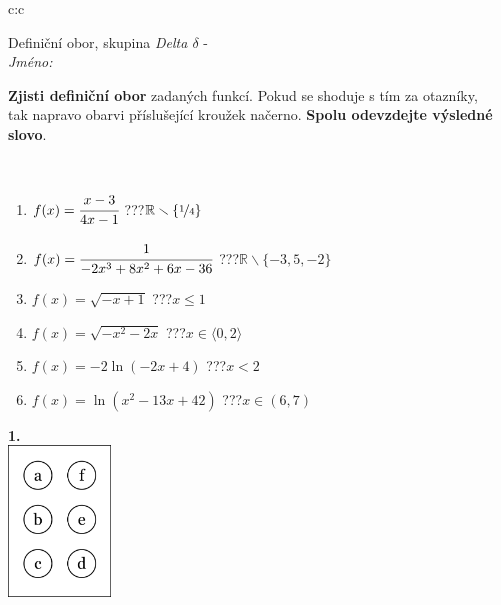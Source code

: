 \documentclass[10pt]{report}
\begin{document}
\begin{tabular}{c:c}
\begin{minipage}[c][104.5mm][t]{0.5\linewidth}
\begin{center}
\vspace{7mm}
{\huge Definiční obor, skupina \textit{Delta $\delta$} -}\\[5mm]
\textit{Jméno:}\phantom{xxxxxxxxxxxxxxxxxxxxxxxxxxxxxxxxxxxxxxxxxxxxxxxxxxxxxxxxxxxxxxxxx}\\[5mm]
\begin{minipage}{0.95\linewidth}
\begin{center}
\textbf{Zjisti definiční obor} zadaných funkcí. Pokud se shoduje s tím za otazníky,\\tak napravo obarvi příslušející kroužek načerno. \textbf{Spolu odevzdejte výsledné slovo}.
\end{center}
\end{minipage}
\\[1mm]
\begin{minipage}{0.79\linewidth}
\begin{center}
\begin{varwidth}{\linewidth}
\begin{enumerate}
\normalsizerrr
\item $f(x)=\cfrac{x-3}{4x-1}$\quad \dotfill\; ???\;\dotfill \quad $\mathbb{R}\smallsetminus\{\nicefrac{1}{4}\}$
\item $f(x)=\cfrac{1}{-2x^3+8x^2+6x-36}$\quad \dotfill\; ???\;\dotfill \quad $\mathbb{R}\smallsetminus\{-3,5,-2\}$
\item $f(x)=\sqrt{-x+1}$\quad \dotfill\; ???\;\dotfill \quad $x\leq1$
\item $f(x)=\sqrt{-x^2-2x}$\quad \dotfill\; ???\;\dotfill \quad $x\in\langle0 , 2\rangle$
\item $f(x)=-2\ln{(-2x+4)}$\quad \dotfill\; ???\;\dotfill \quad $x<2$
\item $f(x)=\ln{(x^2-13x+42)}$\quad \dotfill\; ???\;\dotfill \quad $x\in(6 , 7)$
\end{enumerate}
\end{varwidth}
\end{center}
\end{minipage}
\begin{minipage}{0.20\linewidth}
\begin{center}
{\Huge\bfseries 1.} \\[2mm]
\includegraphics[height=40mm]{../images/braille.png}

\end{center}
\end{minipage}
\end{center}
\end{minipage}
\end{tabular}
\end{document}
